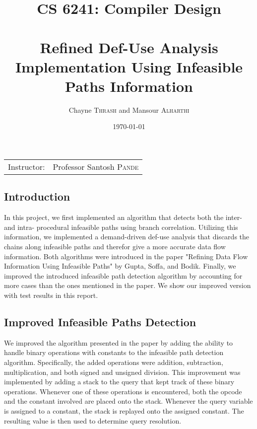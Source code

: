 \documentclass{article}
\title{CS 6241: Compiler Design \\~\\ Refined Def-Use Analysis Implementation Using Infeasible Paths Information} %
\author{Chayne \textsc{Thrash} and Mansour \textsc{Alharthi}} %
\date{\today} %
\begin{document}
\maketitle %

\begin{center}
\begin{tabular}{l r}
Instructor: & Professor Santosh \textsc{Pande} %
\end{tabular}
\end{center}

\subsection{Introduction}
In this project, we first implemented an algorithm that detects both the inter- and intra- procedural infeasible paths using branch correlation. Utilizing this information, we implemented a demand-driven def-use analysis that discards the chains along infeasible paths and therefor give a more accurate data flow information. Both algorithms were introduced in the paper "Refining Data Flow Information Using Infeasible Paths" by Gupta, Soffa, and Bodik. Finally, we improved the introduced infeasible path detection algorithm by accounting for more cases than the ones mentioned in the paper. We show our improved version with test results in this report.

\subsection{Improved Infeasible Paths Detection}
We improved the algorithm presented in the paper by adding the ability to handle binary operations with constants to the infeasible path detection algorithm. Specifically, the added operations were addition, subtraction, multiplication, and both signed and unsigned division. This improvement was implemented by adding a stack to the query that kept track of these binary operations. Whenever one of these operations is encountered, both the opcode and the constant involved are placed onto the stack. Whenever the query variable is assigned to a constant, the stack is replayed onto the assigned constant. The resulting value is then used to determine query resolution. 
\end{document}
